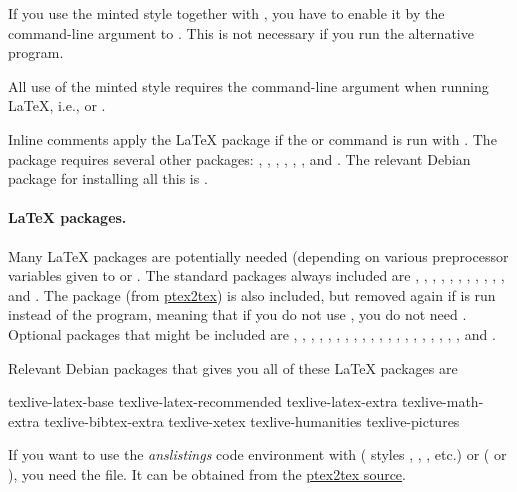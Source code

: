 \documentclass[%
oneside,                 %
final,                   %
10pt]{article}
\begin{document}
If you use the minted style together with , you have to
enable it by the  command-line argument to .
This is not necessary if you run the alternative  program.

All use of the minted style requires the  command-line
argument when running {\LaTeX}, i.e.,  or .

Inline comments apply the  {\LaTeX} package if the 
or  command is run with .  The
 package requires several other packages: ,
, , , , , and . The
relevant Debian package for installing all this is
.

\paragraph{{\LaTeX} packages.}
Many {\LaTeX} packages are potentially needed (depending on various
preprocessor variables given to  or .  The
standard packages always included are , , ,
, , , , , ,
, , and .  The  package (from
\href{{http://code.google.com/p/ptex2tex}}{ptex2tex}) is also included, but
removed again if  is run instead of the 
program, meaning that if you do not use , you do not need
. Optional packages that might be included are ,
, , , , , ,
, , , , , , ,
, , , , , , and
.

Relevant Debian packages that gives you all of these {\LaTeX} packages are

\bccq
texlive-latex-base
texlive-latex-recommended
texlive-latex-extra
texlive-math-extra
texlive-bibtex-extra
texlive-xetex
texlive-humanities
texlive-pictures
\eccq

If you want to use the \emph{anslistings} code environment with 
( styles , , , etc.) or
 ( or ), you need the
 file. It can be obtained from
the \href{{https://code.google.com/p/ptex2tex/source/browse/trunk/latex/styles/with_license/anslistings.sty}}{ptex2tex source}.
\end{document}
